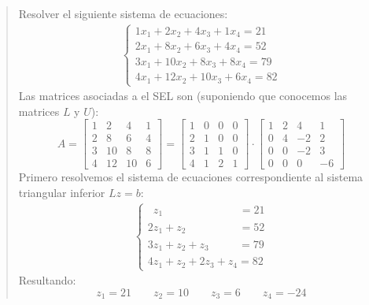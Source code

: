 \begin{quote}
  \label{ej:factorizacion_lu}

  Resolver el siguiente sistema de ecuaciones:
  \begin{align*}
    \begin{cases}
      1x_1 + 2x_2 + 4x_3 + 1x_4 = 21 \\
      2x_1 + 8x_2 + 6x_3 + 4x_4 = 52 \\
      3x_1 + 10x_2 + 8x_3 + 8x_4 = 79 \\
      4x_1 + 12x_2 + 10x_3 + 6x_4 = 82
    \end{cases}
  \end{align*}
  Las matrices asociadas a el SEL son (suponiendo que conocemos las matrices \(L\) y \(U\)):
  \[
  A = \begin{bmatrix}
    1 & 2 & 4 & 1 \\
    2 & 8 & 6 & 4 \\
    3 & 10 & 8 & 8 \\
    4 & 12 & 10 & 6
  \end{bmatrix} = \begin{bmatrix}
    1 & 0 & 0 & 0 \\
    2 & 1 & 0 & 0 \\
    3 & 1 & 1 & 0 \\ 
    4 & 1 & 2 & 1
  \end{bmatrix} \cdot \begin{bmatrix}
    1 & 2 & 4 & 1 \\
    0 & 4 & -2 & 2 \\
    0 & 0 & -2 & 3 \\
    0 & 0 & 0 & -6
  \end{bmatrix}
  \]
  Primero resolvemos el sistema de ecuaciones correspondiente al sistema triangular inferior \(Lz=b\):
  \begin{align*}
    \begin{cases}
      \phantom{1}z_1 \phantom{ + y_2 + y_3 + y_4 00} = 21 \\
      2z_1 +z_2 \phantom{+ 0y_3 + y_4 0} = 52 \\
      3z_1 +z_2 + z_3 \phantom{+ y_4 00} = 79 \\
      4z_1 +z_2 + 2z_3 + z_4 = 82
    \end{cases}
  \end{align*}
  Resultando:
  \[z_1 = 21 \qquad z_2 = 10 \qquad z_3 = 6 \qquad z_4 = -24\]

\end{quote}
